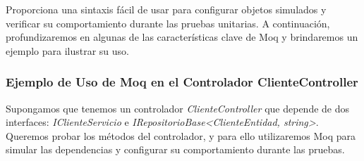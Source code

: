 \documentclass[executivepaper]{article}
\begin{document}
Proporciona una sintaxis fácil de usar para configurar objetos simulados y verificar su comportamiento durante las pruebas unitarias. A continuación, profundizaremos en algunas de las características clave de Moq y brindaremos un ejemplo para ilustrar su uso.

\subsubsection*{Ejemplo de Uso de Moq en el Controlador ClienteController}

Supongamos que tenemos un controlador \emph{ClienteController} que depende de dos interfaces: \emph{IClienteServicio} e \emph{IRepositorioBase<ClienteEntidad, string>}. Queremos probar los métodos del controlador, y para ello utilizaremos Moq para simular las dependencias y configurar su comportamiento durante las pruebas.
\end{document}
